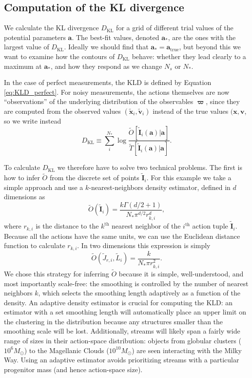 \documentclass{emulateapj}
\newcommand{\sub}[2]{\ensuremath{#1_{\mathrm{#2}}}}
\newcommand{\super}[2]{\ensuremath{#1^{\mathrm{#2}}}}
\begin{document}
\subsection{Computation of the KL divergence}
We calculate the KL divergence $\sub{D}{KL}$ for a grid of different trial values of the potential parameters $\mathbf{a}$. The best-fit values, denoted $\mathbf{a}_*$, are the ones with the largest value of $\sub{D}{KL}$. Ideally we should find that $\mathbf{a}_* = \sub{\mathbf{a}}{true}$, but beyond this we want to examine how the contours of $\sub{D}{KL}$ behave: whether they lead clearly to a maximum at $\mathbf{a}_*$, and how they respond as we change $N_s$ or $N_*$. 

In the case of perfect measurements, the KLD is defined by Equation \eqref{eq:KLD_perfect}.  For noisy measurements, the actions themselves are now ``observations'' of the underlying distribution of the observables $\mathbf{\varpi}$, since they are computed from the observed values $(\tilde{\mathbf{x}}_i,\tilde{\mathbf{v}}_i)$ instead of the true values $(\mathbf{x}, \mathbf{v}$, so we write instead
\begin{equation}
\sub{D}{KL} \equiv \sum_i^{N_*} \log \frac{\tilde{O}[\tilde{\mathbf{I}}_i(\mathbf{a})|\mathbf{a}]}{\tilde{T}[\tilde{\mathbf{I}}_i(\mathbf{a})|\mathbf{a}]}.
\end{equation} 

To calculate $\sub{D}{KL}$ we therefore have to solve two technical problems. The first is how to infer $\tilde{O}$ from the discrete set of points $\tilde{\mathbf{I}}_i$. For this example we take a simple approach and use a $k$-nearest-neighbors density estimator, defined in $d$ dimensions as
\begin{equation}
 \tilde{O}(\tilde{\mathbf{I}}_i) = \frac{k \Gamma\left(d/2 + 1\right)}{N_* \pi^{d/2} r_{k,i}^d},
\end{equation} 
where $r_{k,i}$ is the distance to the $\super{k}{th}$ nearest neighbor of the $\super{i}{th}$ action tuple $\tilde{\mathbf{I}}_i$. Because all the actions have the same units, we can use the Euclidean distance function to calculate $r_{k,i}$. In two dimensions this expression is simply
\begin{equation}
 \tilde{O}(\tilde{J}_{r,i},\tilde{L}_i) = \frac{ k }{N_* \pi r_{k,i}^2}.
\end{equation}
We chose this strategy for inferring $\tilde{O}$ because it is simple, well-understood, and most importantly scale-free: the smoothing is controlled by the number of nearest neighbors $k$, which selects the smoothing length adaptively as a function of the density. An adaptive density estimator is crucial for computing the KLD: an estimator with a set smoothing length will automatically place an upper limit on the clustering in the distribution because any structures smaller than the smoothing scale will be lost. Additionally, streams will likely span a fairly wide range of sizes in their action-space distribution: objects from globular clusters ($10^6 M_\odot$) to the Magellanic Clouds ($10^{10} M_\odot$) are seen interacting with the Milky Way. Using an adaptive estimator avoids prioritizing streams with a particular progenitor mass (and hence action-space size). 
\end{document}
